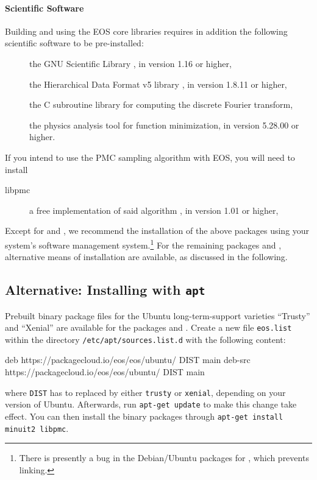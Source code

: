 \paragraph{Scientific Software} Building and using the EOS core libraries requires in addition
the following scientific software to be pre-installed:
\begin{description}
    \item[] the GNU Scientific Library \cite{GSL}, in version 1.16 or higher,
    \item[] the Hierarchical Data Format v5 library \cite{HDF5}, in version 1.8.11 or higher,
    \item[] the C subroutine library for computing the discrete Fourier transform,
    \item[] the physics analysis tool for function minimization, in version 5.28.00 or higher.
\end{description}
If you intend to use the \gls{PMC} sampling algorithm with EOS, you will need to install
\begin{description}
    \item[libpmc] a free implementation of said algorithm \cite{libpmc}, in version 1.01 or higher,
\end{description}

Except for  and , we recommend the installation of the above packages
using your system's software management system.\footnote{%
    There is presently a bug in the Debian/Ubuntu packages for , which prevents
    linking.
}
For the remaining packages  and , alternative means of installation
are available, as discussed in the following.

\subsection{Alternative: Installing with \texttt{apt}}

Prebuilt binary package files for the Ubuntu long-term-support varieties
``Trusty'' and ``Xenial'' are available for the packages  and
. Create a new file \texttt{eos.list} within the directory
\texttt{/etc/apt/sources.list.d} with the following content:
\begin{file}
deb https://packagecloud.io/eos/eos/ubuntu/ DIST main
deb-src https://packagecloud.io/eos/eos/ubuntu/ DIST main
\end{file}
where \texttt{DIST} has to replaced by either \texttt{trusty} or
\texttt{xenial}, depending on your version of Ubuntu. Afterwards, run
\texttt{apt-get update} to make this change take effect.
You can then install the binary packages through \texttt{apt-get
install minuit2 libpmc}.

